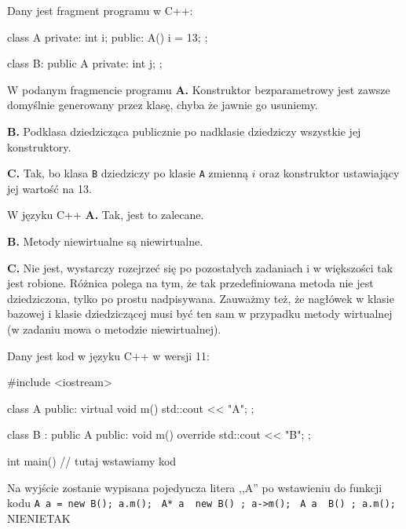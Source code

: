 \begin{solutions}
\sol Dany jest fragment programu w C++:
\begin{cpp}
    class A {
    private:
        int i;
    public:
        A() { i = 13; }
    };

    class B: public A {
    private:
        int j;
    };
\end{cpp}
W podanym fragmencie programu
\textbf{A.} Konstruktor bezparametrowy jest zawsze domyślnie generowany przez klasę, chyba że jawnie go usuniemy.

\textbf{B.} Podklasa dziedzicząca publicznie po nadklasie dziedziczy wszystkie jej konstruktory.

\textbf{C.} Tak, bo klasa \texttt{B} dziedziczy po klasie \texttt{A} zmienną $i$ oraz konstruktor ustawiający jej wartość na 13.

\sol W języku C++
\textbf{A.} Tak, jest to zalecane.

\textbf{B.} Metody niewirtualne są niewirtualne.

\textbf{C.} Nie jest, wystarczy rozejrzeć się po pozostałych zadaniach i w większości tak jest robione. Różnica polega na tym, że tak przedefiniowana metoda nie jest dziedziczona, tylko po prostu nadpisywana. Zauważmy też, że nagłówek w klasie bazowej i klasie dziedziczącej musi być ten sam w przypadku metody wirtualnej (w zadaniu mowa o metodzie niewirtualnej).

\sol Dany jest kod w języku C++ w wersji 11:
\begin{cpp}
    #include <iostream>
    
    class A {
    public:
        virtual void m() { std::cout << "A\n"; }
    };
    
    class B : public A {
    public:
        void m() override { std::cout << "B\n"; }
    };
    
    int main() {
        // tutaj wstawiamy kod
    }
\end{cpp}
Na wyjście zostanie wypisana pojedyncza litera ,,A'' po wstawieniu do funkcji  kodu
\answerss
{\texttt{A a = new B(); a.m(); }}
{\texttt{A* a { new B() }; a->m(); }}
{\texttt{A a { B() }; a.m(); }}
{NIE}{NIE}{TAK}


\end{solutions}
